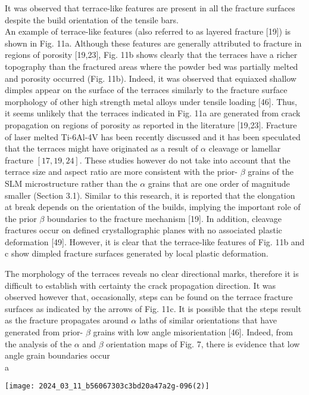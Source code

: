 \documentclass[10pt]{article}
\begin{document}
It was observed that terrace-like features are present in all the fracture surfaces despite the build orientation of the tensile bars.\\
An example of terrace-like features (also referred to as layered fracture [19]) is shown in Fig. 11a. Although these features are generally attributed to fracture in regions of porosity [19,23], Fig. 11b shows clearly that the terraces have a richer topography than the fractured areas where the powder bed was partially melted and porosity occurred (Fig. 11b). Indeed, it was observed that equiaxed shallow dimples appear on the surface of the terraces similarly to the fracture surface morphology of other high strength metal alloys under tensile loading [46]. Thus, it seems unlikely that the terraces indicated in Fig. 11a are generated from crack propagation on regions of porosity as reported in the literature [19,23]. Fracture of laser melted Ti-6Al-4V has been recently discussed and it has been speculated that the terraces might have originated as a result of $\alpha$ cleavage or lamellar fracture $[17,19,24]$. These studies however do not take into account that the terrace size and aspect ratio are more consistent with the prior- $\beta$ grains of the SLM microstructure rather than the $\alpha$ grains that are one order of magnitude smaller (Section 3.1). Similar to this research, it is reported that the elongation at break depends on the orientation of the builds, implying the important role of the prior $\beta$ boundaries to the fracture mechanism [19]. In addition, cleavage fractures occur on defined crystallographic planes with no associated plastic deformation [49]. However, it is clear that the terrace-like features of Fig. 11b and c show dimpled fracture surfaces generated by local plastic deformation.

The morphology of the terraces reveals no clear directional marks, therefore it is difficult to establish with certainty the crack propagation direction. It was observed however that, occasionally, steps can be found on the terrace fracture surfaces as indicated by the arrows of Fig. 11c. It is possible that the steps result as the fracture propagates around $\alpha$ laths of similar orientations that have generated from prior- $\beta$ grains with low angle misorientation [46]. Indeed, from the analysis of the $\alpha$ and $\beta$ orientation maps of Fig. 7, there is evidence that low angle grain boundaries occur\\
a

\begin{center}
\texttt{[image: 2024\_03\_11\_b56067303c3bd20a47a2g-096(2)]}
\end{center}
\end{document}
